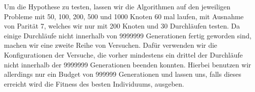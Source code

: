 Um die Hypothese zu testen, lassen wir die Algorithmen auf den jeweiligen Probleme mit 50, 100, 200, 500 und 1000 Knoten 60 mal laufen, mit Ausnahme von Parität 7, welches wir nur mit 200 Knoten und 30 Durchläufen testen. Da einige Durchläufe nicht innerhalb von 9999999 Generationen fertig geworden sind, machen wir eine zweite Reihe von Versuchen. Dafür verwenden wir die Konfigurationen der Versuche, die vorher mindestens ein drittel der Durchläufe nicht innerhalb der 9999999 Generationen beenden konnten. Hierbei benutzen wir allerdings nur ein Budget von 999999 Generationen und lassen uns, falls dieses erreicht wird die Fitness des besten Individuums, ausgeben.
\begin{table}[!ht]
\centering 
\caption{Konfiguration der Versuche für das Paritätsproblem mit 4, 5, 6 und 7 Eingabeknoten.}
\label{table_meta3}
\end{table}


